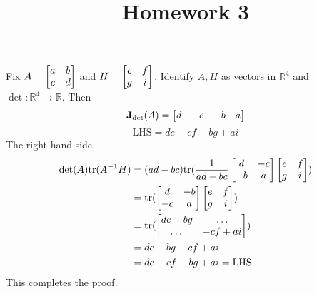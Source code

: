 \documentclass{homework}
\title{Homework 3}
\begin{document}
\maketitle

\begin{problem}{4}
\def \tr{\mathrm{tr}}

Fix $A = \begin{bmatrix}a&b\\c&d\end{bmatrix}$ and $H = \begin{bmatrix}e&f\\g&i\end{bmatrix}$. Identify $A, H$ as vectors in $\mathbb{R}^4$ and $\det : \mathbb{R}^4 \to \mathbb{R}$. Then
$$\mathbf{J}_{\det}(A) = \begin{bmatrix}d&-c&-b&a\end{bmatrix}$$
$$\mathrm{LHS} = de-cf-bg+ai$$
The right hand side
\begin{align*}
  \det(A)\tr(A^{-1}H) &= (ad-bc)\tr(\frac{1}{ad-bc}\bmat{d&-c\\-b&a}\bmat{e&f\\g&i}) \\
                      &= \tr(\bmat{d&-b\\-c&a}\bmat{e&f\\g&i}) \\
                      &= \tr(\bmat{de-bg&\dots\\\dots&-cf+ai}) \\
                      &= de-bg-cf+ai \\
                      &= de-cf-bg+ai = \mathrm{LHS}
\end{align*}
This completes the proof. \QED
\end{problem}
\end{document}
